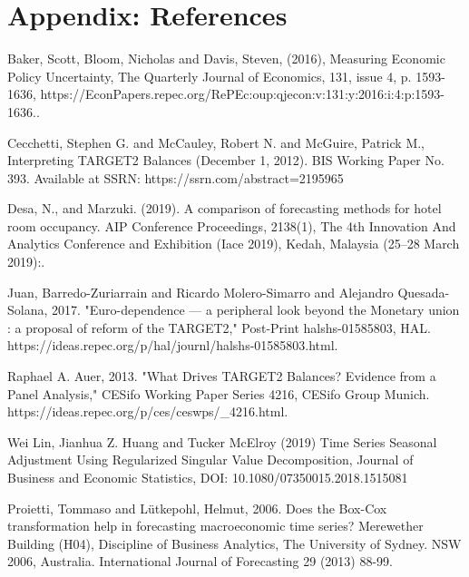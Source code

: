 \documentclass[12pt]{article}
\begin{document}
\clearpage
\onehalfspacing
\section*{Appendix: References} \label{sec:references}

Baker, Scott, Bloom, Nicholas and Davis, Steven, (2016), Measuring Economic Policy Uncertainty, The Quarterly Journal of Economics, 131, issue 4, p. 1593-1636, \newline https://EconPapers.repec.org/RePEc:oup:qjecon:v:131:y:2016:i:4:p:1593-1636..

Cecchetti, Stephen G. and McCauley, Robert N. and McGuire, Patrick M., Interpreting TARGET2 Balances (December 1, 2012). BIS Working Paper No. 393. Available at SSRN: https://ssrn.com/abstract=2195965 

Desa, N., and Marzuki. (2019). A comparison of forecasting methods for hotel room occupancy. AIP Conference Proceedings, 2138(1), The 4th Innovation And Analytics Conference and Exhibition (Iace 2019), Kedah, Malaysia (25–28 March 2019):.

Juan, Barredo-Zuriarrain and Ricardo Molero-Simarro and Alejandro Quesada-Solana, 2017. "Euro-dependence — a peripheral look beyond the Monetary union : a proposal of reform of the TARGET2," Post-Print halshs-01585803, HAL. \newline https://ideas.repec.org/p/hal/journl/halshs-01585803.html. 

Raphael A. Auer, 2013. "What Drives TARGET2 Balances? Evidence from a Panel Analysis," CESifo Working Paper Series 4216, CESifo Group Munich. \newline https://ideas.repec.org/p/ces/ceswps/\_4216.html. 

Wei Lin, Jianhua Z. Huang and Tucker McElroy (2019) Time Series Seasonal Adjustment Using Regularized Singular Value Decomposition, Journal of Business and Economic Statistics, DOI: 10.1080/07350015.2018.1515081

Proietti, Tommaso and Lütkepohl, Helmut, 2006. Does the Box-Cox transformation help in forecasting macroeconomic time series? Merewether Building (H04), Discipline of Business Analytics, The University of Sydney. NSW 2006, Australia. International Journal of Forecasting 29 (2013) 88-99. 
\end{document}
